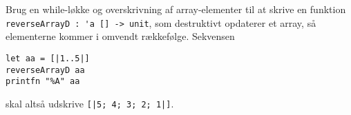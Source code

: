 Brug en while-løkke og overskrivning af array-elementer til at skrive en funktion \lstinline{reverseArrayD : 'a [] -> unit}, som destruktivt opdaterer et array, så elementerne kommer i omvendt rækkefølge.  Sekvensen
\begin{verbatim}
let aa = [|1..5|]
reverseArrayD aa
printfn "%A" aa
\end{verbatim}
skal altså udskrive \lstinline{[|5; 4; 3; 2; 1|]}.
